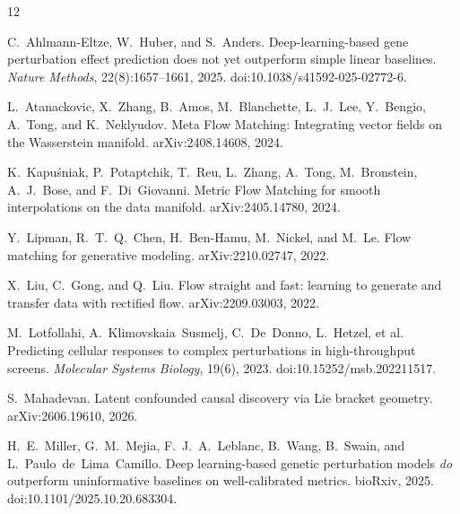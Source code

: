 \documentclass{article}
\begin{document}

\begin{thebibliography}{12}

C.~Ahlmann-Eltze, W.~Huber, and S.~Anders.
\newblock Deep-learning-based gene perturbation effect prediction does not yet outperform
simple linear baselines.
\newblock \emph{Nature Methods}, 22(8):1657--1661, 2025.
doi:10.1038/s41592-025-02772-6.

L.~Atanackovic, X.~Zhang, B.~Amos, M.~Blanchette, L.~J.~Lee, Y.~Bengio, A.~Tong, and
K.~Neklyudov.
\newblock Meta Flow Matching: Integrating vector fields on the Wasserstein manifold.
\newblock arXiv:2408.14608, 2024.

K.~Kapu\'{s}niak, P.~Potaptchik, T.~Reu, L.~Zhang, A.~Tong, M.~Bronstein, A.~J.~Bose, and
F.~Di~Giovanni.
\newblock Metric Flow Matching for smooth interpolations on the data manifold.
\newblock arXiv:2405.14780, 2024.

Y.~Lipman, R.~T.~Q.~Chen, H.~Ben-Hamu, M.~Nickel, and M.~Le.
\newblock Flow matching for generative modeling.
\newblock arXiv:2210.02747, 2022.

X.~Liu, C.~Gong, and Q.~Liu.
\newblock Flow straight and fast: learning to generate and transfer data with rectified flow.
\newblock arXiv:2209.03003, 2022.

M.~Lotfollahi, A.~Klimovskaia~Susmelj, C.~De~Donno, L.~Hetzel, et al.
\newblock Predicting cellular responses to complex perturbations in high-throughput screens.
\newblock \emph{Molecular Systems Biology}, 19(6), 2023. doi:10.15252/msb.202211517.

S.~Mahadevan.
\newblock Latent confounded causal discovery via Lie bracket geometry.
\newblock arXiv:2606.19610, 2026.

H.~E.~Miller, G.~M.~Mejia, F.~J.~A.~Leblanc, B.~Wang, B.~Swain, and
L.~Paulo~de~Lima~Camillo.
\newblock Deep learning-based genetic perturbation models \emph{do} outperform uninformative
baselines on well-calibrated metrics.
\newblock bioRxiv, 2025. doi:10.1101/2025.10.20.683304.


\end{thebibliography}
\end{document}

